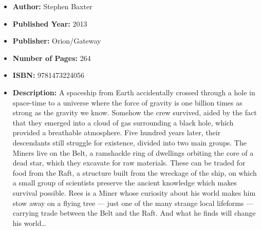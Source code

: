 \documentclass{tufte-handout}
\begin{document}
\begin{itemize}
    \item[] \textbf{Author:} Stephen Baxter
    \item[] \textbf{Published Year:} 2013
    \item[] \textbf{Publisher:} Orion/Gateway
    \item[] \textbf{Number of Pages:} 264      
    \item[] \textbf{ISBN:} 9781473224056
    \item[] \textbf{Description:} A spaceship from Earth accidentally crossed through a hole in space-time to a universe where the force of gravity is one billion times as strong as the gravity we know. Somehow the crew survived, aided by the fact that they emerged into a cloud of gas surrounding a black hole, which provided a breathable atmosphere. Five hundred years later, their descendants still struggle for existence, divided into two main groups. The Miners live on the Belt, a ramshackle ring of dwellings orbiting the core of a dead star, which they excavate for raw materials. These can be traded for food from the Raft, a structure built from the wreckage of the ship, on which a small group of scientists preserve the ancient knowledge which makes survival possible. Rees is a Miner whose curiosity about his world makes him stow away on a flying tree --- just one of the many strange local lifeforms --- carrying trade between the Belt and the Raft. And what he finds will change his world\ldots \end{itemize}
\end{document}
